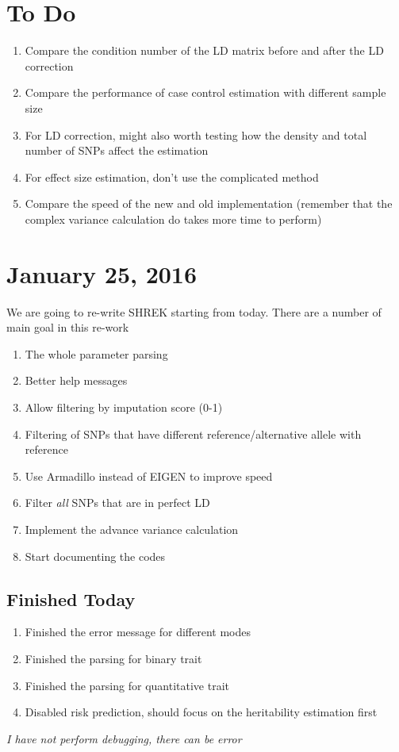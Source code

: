 \documentclass[12pt]{article}
\begin{document}
	\section{To Do}
	\begin{enumerate}
		\item Compare the condition number of the LD matrix before and after the LD correction
		\item Compare the performance of case control estimation with different sample size 
		\item For LD correction, might also worth testing how the density and total number of SNPs affect the estimation
		\item For effect size estimation, don't use the complicated method
		\item Compare the speed of the new and old implementation (remember that the complex variance calculation do takes more time to perform)
	\end{enumerate}
	
	
	
	\section{January 25, 2016}
	We are going to re-write SHREK starting from today. 
	There are a number of main goal in this re-work
	\begin{enumerate}
		\item The whole parameter parsing 
		\item Better help messages
		\item Allow filtering by imputation score (0-1)
		\item Filtering of SNPs that have different reference/alternative allele with reference
		\item Use Armadillo instead of EIGEN to improve speed
		\item Filter \emph{all} SNPs that are in perfect LD
		\item Implement the advance variance calculation 
		\item Start documenting the codes
	\end{enumerate}
	\subsection{Finished Today}
	\begin{enumerate}
		\item Finished the error message for different modes
		\item Finished the parsing for binary trait
		\item Finished the parsing for quantitative trait
		\item Disabled risk prediction, should focus on the heritability estimation first
	\end{enumerate}
	\emph{I have not perform debugging, there can be error}
\end{document}
